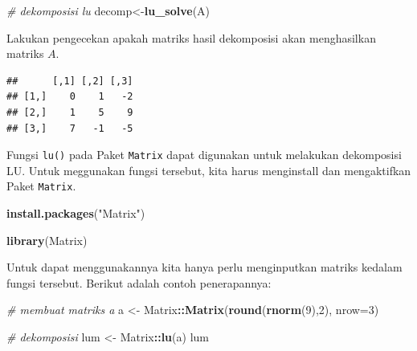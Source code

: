 \documentclass[
]{book}
\newenvironment{Shaded}{\begin{snugshade}}{\end{snugshade}}
\newcommand{\AttributeTok}[1]{\textcolor[rgb]{0.13,0.29,0.53}{#1}}
\newcommand{\CommentTok}[1]{\textcolor[rgb]{0.56,0.35,0.01}{\textit{#1}}}
\newcommand{\DecValTok}[1]{\textcolor[rgb]{0.00,0.00,0.81}{#1}}
\newcommand{\FunctionTok}[1]{\textcolor[rgb]{0.13,0.29,0.53}{\textbf{#1}}}
\newcommand{\NormalTok}[1]{#1}
\newcommand{\OtherTok}[1]{\textcolor[rgb]{0.56,0.35,0.01}{#1}}
\newcommand{\SpecialCharTok}[1]{\textcolor[rgb]{0.81,0.36,0.00}{\textbf{#1}}}
\newcommand{\StringTok}[1]{\textcolor[rgb]{0.31,0.60,0.02}{#1}}
\theoremstyle{definition}
\theoremstyle{definition}
\theoremstyle{definition}
\theoremstyle{definition}
\theoremstyle{remark}
\begin{document}
\begin{Shaded}
\begin{Highlighting}[]
\CommentTok{\# dekomposisi lu}
\NormalTok{decomp}\OtherTok{\textless{}{-}}\FunctionTok{lu\_solve}\NormalTok{(A)}
\end{Highlighting}
\end{Shaded}

Lakukan pengecekan apakah matriks hasil dekomposisi akan menghasilkan matriks \(A\).

\begin{Shaded}
\end{Shaded}

\begin{verbatim}
##      [,1] [,2] [,3]
## [1,]    0    1   -2
## [2,]    1    5    9
## [3,]    7   -1   -5
\end{verbatim}

Fungsi \texttt{lu()} pada Paket \texttt{Matrix} dapat digunakan untuk melakukan dekomposisi LU. Untuk meggunakan fungsi tersebut, kita harus menginstall dan mengaktifkan Paket \texttt{Matrix}.

\begin{Shaded}
\begin{Highlighting}[]
\FunctionTok{install.packages}\NormalTok{(}\StringTok{"Matrix"}\NormalTok{)}
\end{Highlighting}
\end{Shaded}

\begin{Shaded}
\begin{Highlighting}[]
\FunctionTok{library}\NormalTok{(Matrix)}
\end{Highlighting}
\end{Shaded}

Untuk dapat menggunakannya kita hanya perlu menginputkan matriks kedalam fungsi tersebut. Berikut adalah contoh penerapannya:

\begin{Shaded}
\begin{Highlighting}[]
\CommentTok{\# membuat matriks a }
\NormalTok{a }\OtherTok{\textless{}{-}}\NormalTok{ Matrix}\SpecialCharTok{::}\FunctionTok{Matrix}\NormalTok{(}\FunctionTok{round}\NormalTok{(}\FunctionTok{rnorm}\NormalTok{(}\DecValTok{9}\NormalTok{),}\DecValTok{2}\NormalTok{), }\AttributeTok{nrow=}\DecValTok{3}\NormalTok{)}

\CommentTok{\# dekomposisi}
\NormalTok{lum }\OtherTok{\textless{}{-}}\NormalTok{ Matrix}\SpecialCharTok{::}\FunctionTok{lu}\NormalTok{(a)}
\NormalTok{lum}
\end{Highlighting}
\end{Shaded}
\end{document}
